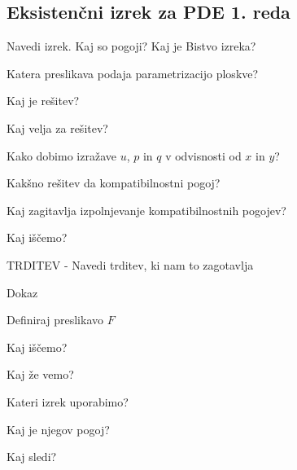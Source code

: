 \documentclass{article}
\begin{document}
    \subsection{Eksistenčni izrek za PDE 1. reda}
    \begin{enumerate}
        {\color{red}\item Navedi izrek. Kaj so pogoji? Kaj je Bistvo izreka?}
        {\color{red}\item Katera preslikava podaja parametrizacijo ploskve?}
        \item Kaj je rešitev?
        \item Kaj velja za rešitev?
        {\color{red}\item Kako dobimo izražave $u$, $p$ in $q$ v odvisnosti od $x$ in $y$?}
        {\color{red}\item Kakšno rešitev da kompatibilnostni pogoj?}
        {\color{red}\item Kaj zagitavlja izpolnjevanje kompatibilnostnih pogojev?}
        {\color{red}\item Kaj iščemo?}
        {\color{red}\item TRDITEV - Navedi trditev, ki nam to zagotavlja}

        Dokaz
        {\color{red}\item Definiraj preslikavo $F$}
        {\color{red}\item Kaj iščemo? }
        \item Kaj že vemo?
        {\color{red}\item Kateri izrek uporabimo?}
        {\color{red}\item Kaj je njegov pogoj?}
        {\color{red}\item Kaj sledi?}
    \end{enumerate}
\end{document}
